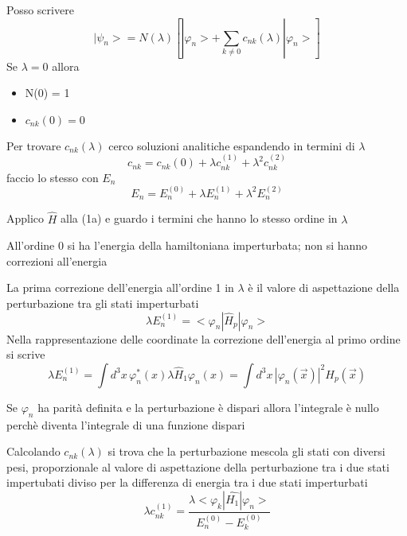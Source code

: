 Posso scrivere 
\begin{equation*}
    |\psi_n> = N(\lambda)\left[|\varphi_n> + \sum_{k \neq 0 }c_{nk}(\lambda)|\varphi_n>\right] \tag{1a}
\end{equation*}
Se \(\lambda = 0\) allora
\begin{itemize}
    \item N(0) = 1
    \item \(c_{nk}(0)=0\)
\end{itemize}
Per trovare \(c_{nk}(\lambda)\) cerco soluzioni analitiche espandendo in termini di \(\lambda\)
\begin{equation*}
    c_{nk} = c_{nk}(0) + \lambda c_{nk}^{(1)} + \lambda^2 c_{nk}^{(2)}
\end{equation*} 
faccio lo stesso con \(E_n\)
\begin{equation*}
    E_n = E_n^{(0)} + \lambda E_n^{(1)} + \lambda^2 E_n^{(2)}
\end{equation*}

\noindent Applico \(\hat{H}\) alla (1a) e guardo i termini che hanno lo stesso ordine in \(\lambda\)

\noindent All'ordine 0 si ha l'energia della hamiltoniana imperturbata; non si hanno correzioni all'energia

\noindent La prima correzione dell'energia all'ordine 1 in \(\lambda\) è il valore di aspettazione della perturbazione tra gli stati imperturbati
\begin{equation*}
    \lambda E^{(1)}_n = <\varphi_n| \hat{H}_p | \varphi_n>
\end{equation*}
Nella rappresentazione delle coordinate la correzione dell'energia al primo ordine si scrive
\begin{equation*}
    \lambda E_n^{(1)} = \int d^3x \, \varphi_n^* (x) \lambda \hat{H}_1 \varphi_n (x) = \int d^3 x \, {|\varphi_n (\vec{x})|}^2 H_p(\vec{x})
\end{equation*}

\noindent Se \(\varphi_n\) ha parità definita e la perturbazione è dispari allora l'integrale è nullo perchè diventa l'integrale di una funzione dispari 

\noindent Calcolando \(c_{nk}(\lambda)\) si trova che la perturbazione mescola gli stati con diversi pesi, proporzionale al valore di aspettazione della perturbazione tra i due stati impertubati diviso per la differenza di energia tra i due stati imperturbati
\begin{equation*}
    \lambda c_{nk}^{(1)} = \frac{\lambda < \varphi_k |\hat{H_1} | \varphi_n> }{E^{(0)}_n - E^{(0)}_k }
\end{equation*}

